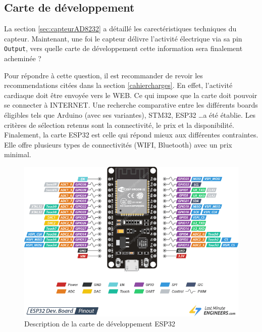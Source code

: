 \subsection{Carte de développement}
La section \ref{sec:capteurAD8232} a détaillé les carectéristiques techniques du capteur. Maintenant, une foi le capteur délivre l'activité électrique via sa pin \texttt{Output}, vers quelle carte de développement cette information sera finalement acheminée ?

Pour répondre à cette question, il est recommander de revoir les recommendations citées dans la section \ref{cahiercharges}. En effet, l'activité cardiaque doit être envoyée vers le WEB. Ce qui impose que la carte doit pouvoir se connecter à INTERNET. Une recherche comparative entre les différents boards éligibles tels que Arduino (avec ses variantes), STM32, ESP32 \ldots a été établie. Les critères de sélection retenus sont la connectivité, le prix et la disponibilité. Finalement, la carte ESP32 est celle qui répond mieux aux différentes contraintes. Elle offre plusieurs types de connectivités (WIFI, Bluetooth) avec un prix minimal.


\begin{figure}[H]
  \centering
  \includegraphics[scale=2]{imgs/ESP32-Pinout.png}
  \caption{Description de la carte de développement ESP32}
\end{figure}

